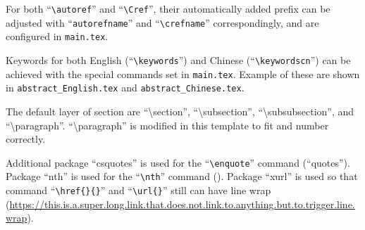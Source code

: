 For both \enquote{\texttt{\textbackslash autoref}} and \enquote{\texttt{\textbackslash Cref}}, their automatically added prefix can be adjusted with \enquote{\texttt{autorefname}} and \enquote{\texttt{\textbackslash crefname}} correspondingly, and are configured in \texttt{main.tex}.

Keywords for both English (\enquote{\texttt{\textbackslash keywords}}) and Chinese (\enquote{\texttt{\textbackslash keywordscn}}) can be achieved with the special commands set in \texttt{main.tex}. Example of these are shown in \texttt{abstract\_English.tex} and \texttt{abstract\_Chinese.tex}.

The default layer of section are \enquote{\textbackslash section}, \enquote{\textbackslash subsection}, \enquote{\textbackslash subsubsection}, and \enquote{\textbackslash paragraph}. \enquote{\textbackslash paragraph} is modified in this template to fit and number correctly.


Additional package \enquote{csquotes} is used for the \enquote{\texttt{\textbackslash enquote}} command (\enquote{quotes}). Package \enquote{nth} is used for the \enquote{\texttt{\textbackslash nth}} command (). Package \enquote{xurl} is used so that command \enquote{\texttt{\textbackslash href\{\}\{\}}} and \enquote{\texttt{\textbackslash url\{\}}} still can have line wrap (\url{https://this.is.a.super.long.link.that.does.not.link.to.anything.but.to.trigger.line.wrap}).


\clearpage
